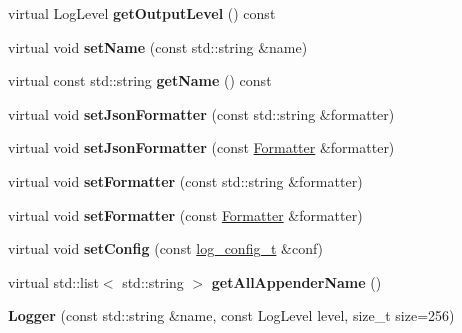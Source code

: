 \begin{DoxyCompactItemize}
virtual Log\+Level {\bfseries get\+Output\+Level} () const
\item 
\mbox{\label{classDAQ_1_1Logger_a7c508b96831faf10f42c39eb5b640c05}} 
virtual void {\bfseries set\+Name} (const std\+::string \&name)
\item 
\mbox{\label{classDAQ_1_1Logger_a40cd3dcba8bec6841a01ca62f5b1d7c8}} 
virtual const std\+::string {\bfseries get\+Name} () const
\item 
\mbox{\label{classDAQ_1_1Logger_ae25f64b62c7c1e69d24fc5849188b349}} 
virtual void {\bfseries set\+Json\+Formatter} (const std\+::string \&formatter)
\item 
\mbox{\label{classDAQ_1_1Logger_afc812bbaab5679a4c988623488eb78a3}} 
virtual void {\bfseries set\+Json\+Formatter} (const \hyperlink{classDAQ_1_1Formatter}{Formatter} \&formatter)
\item 
\mbox{\label{classDAQ_1_1Logger_a344c8cedee67aaf6faa28797bc0f0e9f}} 
virtual void {\bfseries set\+Formatter} (const std\+::string \&formatter)
\item 
\mbox{\label{classDAQ_1_1Logger_aad37eb8c6a081af460808650458eb9a0}} 
virtual void {\bfseries set\+Formatter} (const \hyperlink{classDAQ_1_1Formatter}{Formatter} \&formatter)
\item 
\mbox{\label{classDAQ_1_1Logger_a991fc64966bf83211bff5d08b8270eb5}} 
virtual void {\bfseries set\+Config} (const \hyperlink{structDAQ_1_1LogConfigStruct}{log\+\_\+config\+\_\+t} \&conf)
\item 
\mbox{\label{classDAQ_1_1Logger_a7354675deaf4af17146083c51e6a7a67}} 
virtual std\+::list$<$ std\+::string $>$ {\bfseries get\+All\+Appender\+Name} ()
\item 
\mbox{\label{classDAQ_1_1Logger_a3828ac0de9af1e342d8a2e446a92aa53}} 
{\bfseries Logger} (const std\+::string \&name, const Log\+Level level, size\+\_\+t size=256)
\end{DoxyCompactItemize}
